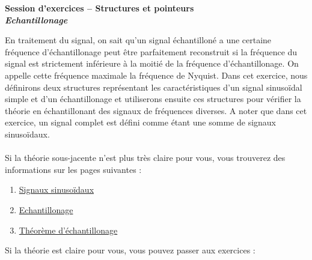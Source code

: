 \documentclass[11pt]{article}
\begin{document}
\begin{center}{\bf Session d'exercices -- Structures et pointeurs}\\
\textbf{\emph{Echantillonage}}
\end{center}

En traitement du signal, on sait qu'un signal échantilloné a une certaine fréquence d'échantillonage peut être parfaitement reconstruit si la fréquence du signal est strictement inférieure à la moitié de la fréquence d'échantillonage. On appelle cette fréquence maximale la fréquence de Nyquist. Dans cet exercice, nous définirons deux structures représentant les caractéristiques d'un signal sinusoïdal simple et d'un échantillonage et utiliserons ensuite ces structures pour vérifier la théorie en échantillonant des signaux de fréquences diverses. A noter que dans cet exercice, un signal complet est défini comme étant une somme de signaux sinusoïdaux.\\
\\
Si la théorie sous-jacente n'est plus très claire pour vous, vous trouverez des informations sur les pages suivantes : 
\begin{enumerate}

\item  \href{https://fr.wikipedia.org/wiki/Signal\_sinuso\%C3\%AFdal}{Signaux sinusoïdaux}
\item \href{https://fr.wikipedia.org/wiki/\%C3\%89chantillonnage\_(signal)}{Echantillonage}
\item \href{https://fr.wikipedia.org/wiki/Th\%C3\%A9or\%C3\%A8me\_d\%27\%C3\%A9chantillonnage}{Théorème d'échantillonage}
\end{enumerate}

Si la théorie est claire pour vous, vous pouvez passer aux exercices :
\end{document}
